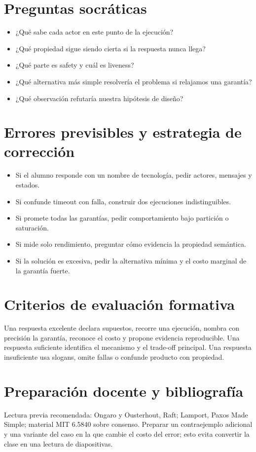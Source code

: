 \documentclass[variant=docente,cover=institutional,mode=screen]{ua-engineering-v6-article}
\begin{document}
\section{Preguntas socráticas}
\begin{itemize}
\item ¿Qué sabe cada actor en este punto de la ejecución?
\item ¿Qué propiedad sigue siendo cierta si la respuesta nunca llega?
\item ¿Qué parte es safety y cuál es liveness?
\item ¿Qué alternativa más simple resolvería el problema si relajamos una garantía?
\item ¿Qué observación refutaría nuestra hipótesis de diseño?
\end{itemize}

\section{Errores previsibles y estrategia de corrección}
\begin{itemize}
\item Si el alumno responde con un nombre de tecnología, pedir actores, mensajes y estados.
\item Si confunde timeout con falla, construir dos ejecuciones indistinguibles.
\item Si promete todas las garantías, pedir comportamiento bajo partición o saturación.
\item Si mide solo rendimiento, preguntar cómo evidencia la propiedad semántica.
\item Si la solución es excesiva, pedir la alternativa mínima y el costo marginal de la garantía fuerte.
\end{itemize}

\section{Criterios de evaluación formativa}
Una respuesta excelente declara supuestos, recorre una ejecución, nombra con precisión la garantía, reconoce el costo y propone evidencia reproducible. Una respuesta suficiente identifica el mecanismo y el trade-off principal. Una respuesta insuficiente usa slogans, omite fallas o confunde producto con propiedad.

\section{Preparación docente y bibliografía}
Lectura previa recomendada: Ongaro y Ousterhout, Raft; Lamport, Paxos Made Simple; material MIT 6.5840 sobre consenso. Preparar un contraejemplo adicional y una variante del caso en la que cambie el costo del error; esto evita convertir la clase en una lectura de diapositivas.
\end{document}
